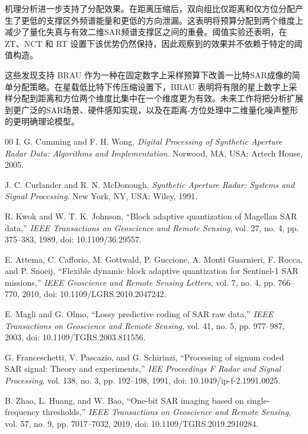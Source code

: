 \documentclass[conference]{IEEEtran}
\begin{document}
机理分析进一步支持了分配效果。在距离压缩后，双向组比仅距离和仅方位分配产生了更低的支撑区外频谱能量和更低的方向泄漏。这表明将预算分配到两个维度上减少了量化失真与有效二维SAR频谱支撑区之间的重叠。阈值实验还表明，在 ZT、NCT 和 RT 设置下该优势仍然保持，因此观察到的效果并不依赖于特定的阈值构造。

这些发现支持 BRAU 作为一种在固定数字上采样预算下改善一比特SAR成像的简单分配策略。在星载低比特下传压缩设置下，BRAU 表明将有限的星上数字上采样分配到距离和方位两个维度比集中在一个维度更为有效。未来工作将把分析扩展到更广泛的SAR场景、硬件感知实现，以及在距离-方位处理中二维量化噪声整形的更明确理论模型。

\begin{thebibliography}{00}
I. G. Cumming and F. H. Wong, \textit{Digital Processing of Synthetic Aperture Radar Data: Algorithms and Implementation}. Norwood, MA, USA: Artech House, 2005.

J. C. Curlander and R. N. McDonough, \textit{Synthetic Aperture Radar: Systems and Signal Processing}. New York, NY, USA: Wiley, 1991.

R. Kwok and W. T. K. Johnson, ``Block adaptive quantization of Magellan SAR data,'' \textit{IEEE Transactions on Geoscience and Remote Sensing}, vol. 27, no. 4, pp. 375--383, 1989, doi: 10.1109/36.29557.

E. Attema, C. Cafforio, M. Gottwald, P. Guccione, A. Monti Guarnieri, F. Rocca, and P. Snoeij, ``Flexible dynamic block adaptive quantization for Sentinel-1 SAR missions,'' \textit{IEEE Geoscience and Remote Sensing Letters}, vol. 7, no. 4, pp. 766--770, 2010, doi: 10.1109/LGRS.2010.2047242.

E. Magli and G. Olmo, ``Lossy predictive coding of SAR raw data,'' \textit{IEEE Transactions on Geoscience and Remote Sensing}, vol. 41, no. 5, pp. 977--987, 2003, doi: 10.1109/TGRS.2003.811556.

G. Franceschetti, V. Pascazio, and G. Schirinzi, ``Processing of signum coded SAR signal: Theory and experiments,'' \textit{IEE Proceedings F Radar and Signal Processing}, vol. 138, no. 3, pp. 192--198, 1991, doi: 10.1049/ip-f-2.1991.0025.

B. Zhao, L. Huang, and W. Bao, ``One-bit SAR imaging based on single-frequency thresholds,'' \textit{IEEE Transactions on Geoscience and Remote Sensing}, vol. 57, no. 9, pp. 7017--7032, 2019, doi: 10.1109/TGRS.2019.2910284.


\end{thebibliography}
\end{document}
